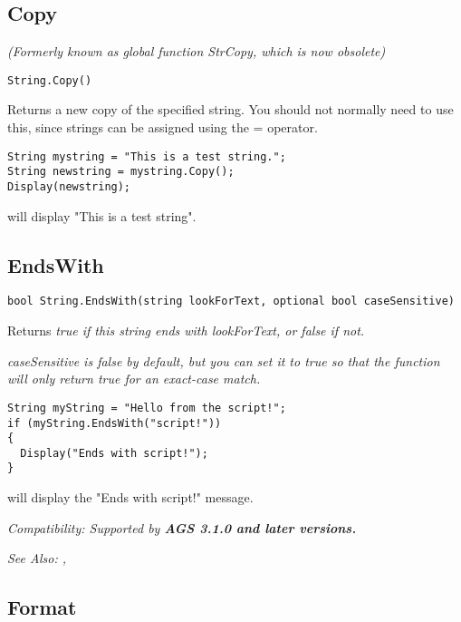 \subsection{Copy}\label{String.Copy}%

\it{(Formerly known as global function StrCopy, which is now obsolete)}

\begin{verbatim}
String.Copy()
\end{verbatim}
Returns a new copy of the specified string. You should not normally need to use this,
since strings can be assigned using the = operator.

\begin{verbatim}
String mystring = "This is a test string.";
String newstring = mystring.Copy();
Display(newstring);
\end{verbatim}
will display "This is a test string".


\subsection{EndsWith}\label{String.EndsWith}%

\begin{verbatim}
bool String.EndsWith(string lookForText, optional bool caseSensitive)
\end{verbatim}
Returns \it{true} if this string ends with \it{lookForText}, or \it{false} if not.

\it{caseSensitive} is \it{false} by default, but you can set it to true so that the
function will only return \it{true} for an exact-case match.

\begin{verbatim}
String myString = "Hello from the script!";
if (myString.EndsWith("script!"))
{
  Display("Ends with script!");
}
\end{verbatim}
will display the "Ends with script!" message.

\it{Compatibility:} Supported by \bf{AGS 3.1.0} and later versions.

\it{See Also:} ,


\subsection{Format}\label{String.Format}%

